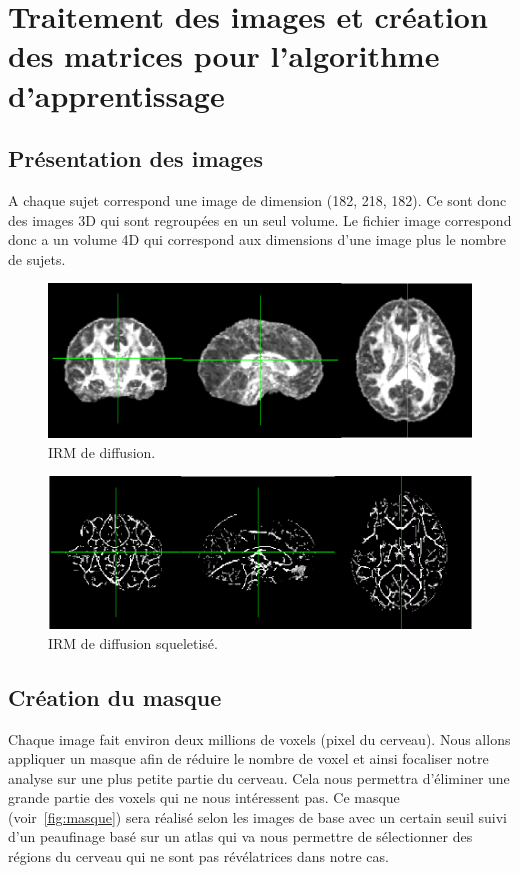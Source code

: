\section{Traitement des images et création des matrices pour l'algorithme d'apprentissage}

\subsection{Présentation des images}

A chaque sujet correspond une image de dimension (182, 218, 182). Ce sont donc des images 3D qui sont regroupées en un seul volume. Le fichier image correspond donc a un volume 4D qui correspond aux dimensions d'une image plus le nombre de sujets.


\begin{figure}[htpb]
	\centering
	\includegraphics[scale = 0.5]{images/example_dwi}
	\caption{IRM de diffusion.}
	\label{fig:IRM}
\end{figure}

\begin{figure}[htpb]
	\centering
	\includegraphics[scale = 0.5]{images/example_dwi_skel}
	\caption{IRM de diffusion squeletisé.}
	\label{fig:IRM_skel}
\end{figure}


\subsection{Création du masque}

Chaque image fait environ deux millions de voxels (pixel du cerveau). Nous allons appliquer un masque afin de réduire le nombre de voxel et ainsi focaliser notre analyse sur une plus petite partie du cerveau. Cela nous permettra d'éliminer une grande partie des voxels qui ne nous intéressent pas. 
Ce masque (voir~\autoref{fig:masque}) sera réalisé selon les images de base avec un certain seuil suivi d'un peaufinage basé sur un atlas qui va nous permettre de sélectionner des régions du cerveau qui ne sont pas révélatrices dans notre cas. 

